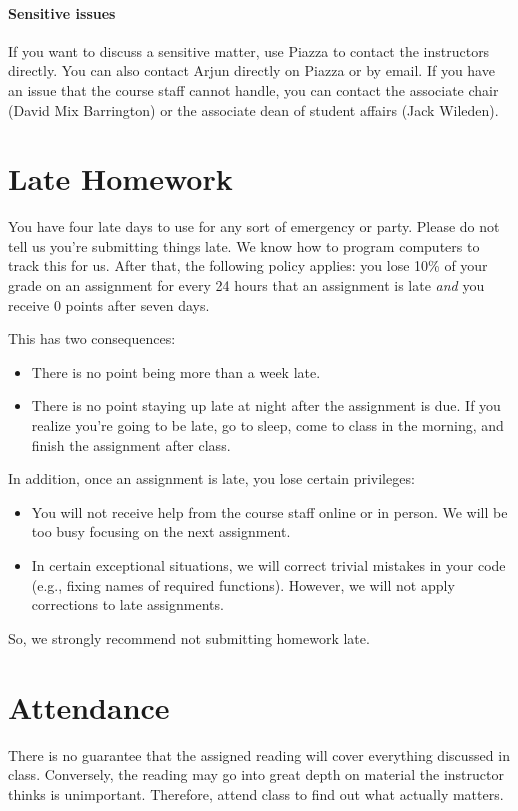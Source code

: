 \documentclass{article}
\begin{document}
\paragraph{Sensitive issues} If you want to discuss a sensitive matter, use
Piazza to contact the instructors directly. You can also contact Arjun directly
on Piazza or by email. If you have an issue that the course staff cannot
handle, you can contact the associate chair (David Mix Barrington) or the
associate dean of student affairs (Jack Wileden).


\section{Late Homework}

You have four late days to use for any sort of emergency or party. Please do
not tell us you're submitting things late. We know how to program computers to
track this for us. After that, the following policy applies: you lose 10\% of
your grade on an assignment for every 24 hours that an assignment is late
\emph{and} you receive 0 points after seven days.

This has two consequences:

\begin{itemize}
  
  \item There is no point being more than a week late.

  \item There is no point staying up late at night after the assignment is due.
  If you realize you’re going to be late, go to sleep, come to class in the
  morning, and finish the assignment after class.

\end{itemize}

In addition, once an assignment is late, you lose certain privileges:

\begin{itemize}

  \item You will  not receive help from the course staff online or in person.
  We will be too busy focusing on the next assignment.

  \item In certain exceptional situations, we will correct trivial mistakes in
  your code (e.g., fixing names of required functions). However, we will not
  apply corrections to late assignments.

\end{itemize}

So, we strongly recommend not submitting homework late.


\section{Attendance}

There is no guarantee that the assigned reading will cover everything discussed
in class. Conversely, the reading may go into great depth on material the
instructor thinks is unimportant. Therefore, attend class to find out what
actually matters.
\end{document}
